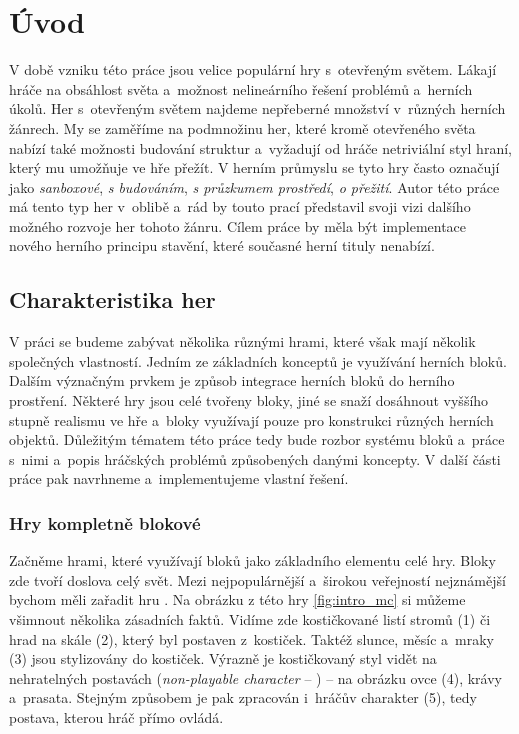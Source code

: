 
\chapter{Úvod}

V době vzniku této práce jsou velice populární hry s~otevřeným světem. Lákají hráče na obsáhlost světa a~možnost nelineárního řešení problémů a~herních úkolů. Her s~otevřeným světem najdeme nepřeberné množství v~různých herních žánrech. My se zaměříme na podmnožinu her, které kromě otevřeného světa nabízí také možnosti budování struktur a~vyžadují od hráče netriviální styl hraní, který mu umožňuje ve hře přežít. V herním průmyslu se tyto hry často označují jako \textit{sanboxové}, \textit{s budováním}, \textit{s průzkumem prostředí}, \textit{o přežití}. Autor této práce má tento typ her v~oblibě a~rád by touto prací představil svoji vizi dalšího možného rozvoje her tohoto žánru. Cílem práce by měla být implementace nového herního principu stavění, které současné herní tituly nenabízí.

\section{Charakteristika her}
V práci se budeme zabývat několika různými hrami, které však mají několik společných vlastností. Jedním ze základních konceptů je využívání herních bloků. Dalším význačným prvkem je způsob integrace herních bloků do herního prostření. Některé hry jsou celé tvořeny bloky, jiné se snaží dosáhnout vyššího stupně realismu ve hře a~bloky využívají pouze pro konstrukci různých herních objektů. Důležitým tématem této práce tedy bude rozbor systému bloků a~práce s~nimi a~popis hráčských problémů způsobených danými koncepty. V další části práce pak navrhneme a~implementujeme vlastní řešení.




\subsection{Hry kompletně blokové}
Začněme hrami, které využívají bloků jako základního elementu celé hry. Bloky zde tvoří doslova celý svět. Mezi nejpopulárnější a~širokou veřejností nejznámější bychom měli zařadit hru \MC{}. Na obrázku z této hry \ref{fig:intro_mc} si můžeme všimnout několika zásadních faktů. Vidíme zde kostičkované listí stromů (1) či hrad na skále (2), který byl postaven z~kostiček. Taktéž slunce, měsíc a~mraky (3) jsou stylizovány do kostiček. Výrazně je kostičkovaný styl vidět na nehratelných postavách (\textit{non-playable character} -- \NPC{}) -- na obrázku ovce (4), krávy a~prasata. Stejným způsobem je pak zpracován i~hráčův charakter (5), tedy postava, kterou hráč přímo ovládá.

